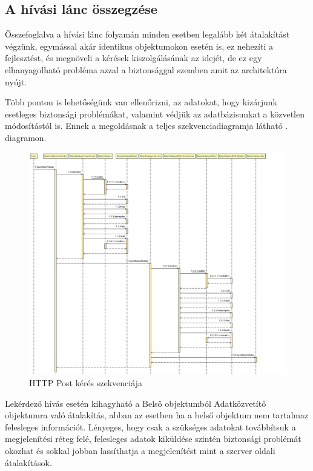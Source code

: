 \subsection{A hívási lánc összegzése}

Összefoglalva a hívási lánc folyamán minden esetben legalább két átalakítást végzünk, egymással akár identikus objektumokon esetén is, ez nehezíti a fejlesztést, és megnöveli a kérések kiszolgálásának az idejét, de ez egy elhanyagolható probléma azzal a biztonsággal szemben amit az architektúra nyújt. 

Több ponton is lehetőségünk van ellenőrizni, az adatokat, hogy kizárjunk esetleges biztonsági problémákat, valamint védjük az adatbázisunkat a közvetlen módosítástól is. Ennek a megoldásnak a teljes szekvenciadiagramja látható . diagramon.
\begin{figure}[h]
	\centering
	\includegraphics[scale=0.3]{images/teljesSzekvencia.png}
	\caption{HTTP Post kérés szekvenciája}
	\label{fig:teljesszekvencia}
\end{figure}

Lekérdező hívás esetén kihagyható a Belső objektumból Adatközvetítő objektumra való átalakítás, abban az esetben ha a belső objektum nem tartalmaz felesleges információt. Lényeges, hogy csak a szükséges adatokat továbbítsuk a megjelenítési réteg felé, felesleges adatok kiküldése szintén biztonsági problémát okozhat és sokkal jobban lassíthatja a megjelenítést mint a szerver oldali átalakítások. 

